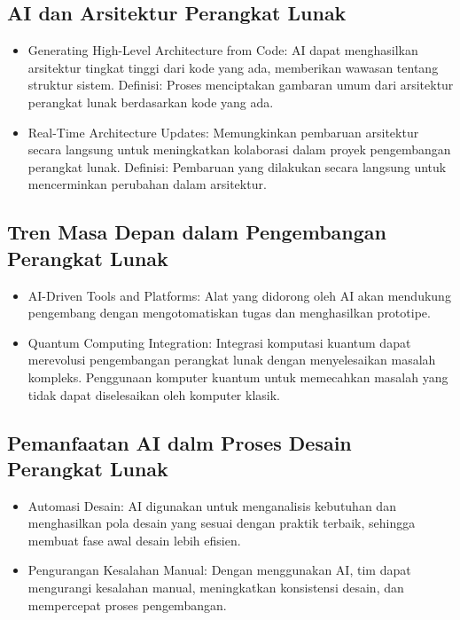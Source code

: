 \documentclass{article}
\begin{document}
\subsection{AI dan Arsitektur Perangkat Lunak}
\begin{itemize}
    \item Generating High-Level Architecture from Code: AI dapat menghasilkan arsitektur tingkat tinggi dari kode yang ada, memberikan wawasan tentang struktur sistem. Definisi: Proses menciptakan gambaran umum dari arsitektur perangkat lunak berdasarkan kode yang ada.
    \item Real-Time Architecture Updates: Memungkinkan pembaruan arsitektur secara langsung untuk meningkatkan kolaborasi dalam proyek pengembangan perangkat lunak. Definisi: Pembaruan yang dilakukan secara langsung untuk mencerminkan perubahan dalam arsitektur.
\end{itemize}

\subsection{Tren Masa Depan dalam Pengembangan Perangkat Lunak}
\begin{itemize}
    \item AI-Driven Tools and Platforms: Alat yang didorong oleh AI akan mendukung pengembang dengan mengotomatiskan tugas dan menghasilkan prototipe.
    \item Quantum Computing Integration: Integrasi komputasi kuantum dapat merevolusi pengembangan perangkat lunak dengan menyelesaikan masalah kompleks. Penggunaan komputer kuantum untuk memecahkan masalah yang tidak dapat diselesaikan oleh komputer klasik.
\end{itemize}

\subsection{Pemanfaatan AI dalm Proses Desain Perangkat Lunak}
\begin{itemize}
    \item Automasi Desain: AI digunakan untuk menganalisis kebutuhan dan menghasilkan pola desain yang sesuai dengan praktik terbaik, sehingga membuat fase awal desain lebih efisien.
    \item Pengurangan Kesalahan Manual: Dengan menggunakan AI, tim dapat mengurangi kesalahan manual, meningkatkan konsistensi desain, dan mempercepat proses pengembangan.
\end{itemize}
\end{document}
